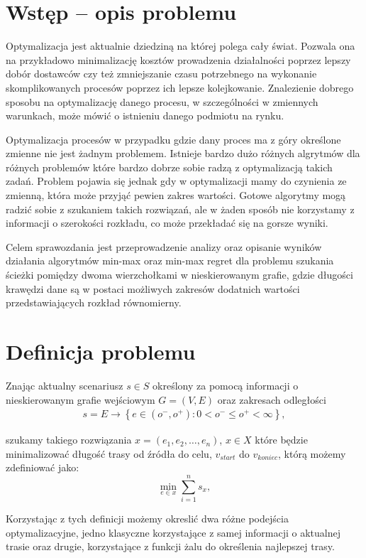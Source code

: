 \documentclass[10pt]{article}
\begin{document}
\section{Wstęp -- opis problemu}
\label{sec:wstep}
Optymalizacja jest aktualnie dziedziną na której polega cały świat. Pozwala ona na przykładowo minimalizację kosztów prowadzenia działalności poprzez lepszy dobór dostawców czy też zmniejszanie czasu potrzebnego na wykonanie skomplikowanych procesów poprzez ich lepsze kolejkowanie. Znalezienie dobrego sposobu na optymalizację danego procesu, w szczególności w zmiennych warunkach, może mówić o istnieniu danego podmiotu na rynku.

Optymalizacja procesów w przypadku gdzie dany proces ma z góry określone zmienne nie jest żadnym problemem. Istnieje bardzo dużo różnych algrytmów dla różnych problemów które bardzo dobrze sobie radzą z optymalizacją takich zadań. Problem pojawia się jednak gdy w optymalizacji mamy do czynienia ze zmienną, która może przyjąć pewien zakres wartości. Gotowe algorytmy mogą radzić sobie z szukaniem takich rozwiązań, ale w żaden sposób nie korzystamy z informacji o szerokości rozkładu, co może przekładać się na gorsze wyniki.

Celem sprawozdania jest przeprowadzenie analizy oraz opisanie wyników działania algorytmów min-max oraz min-max regret dla problemu szukania ścieżki pomiędzy dwoma wierzchołkami w nieskierowanym grafie, gdzie długości krawędzi dane są w postaci możliwych zakresów dodatnich wartości przedstawiających rozkład równomierny.

\section{Definicja problemu}
Znając aktualny scenariusz $s \in S$ określony za pomocą informacji o nieskierowanym grafie wejściowym $G = (V, E)$ oraz zakresach odległości
\begin{eqnarray*}
  s = E \rightarrow \left\{e \in (o^-,  o^+): 0 < o^- \leq o^+ < \infty\right\},
\end{eqnarray*}

szukamy takiego rozwiązania $x = \left(e_1, e_2, \dots, e_n\right)$, $x \in X$ które będzie minimalizować długość trasy od źródła do celu, $v_{start}$ do $v_{koniec}$, którą możemy zdefiniować jako:
\begin{equation}
  \min_{e \in x} \sum_{i=1}^{n} s_x,
\end{equation}

Korzystając z tych definicji możemy okreslić dwa różne podejścia optymalizacyjne, jedno klasyczne korzystające z samej informacji o aktualnej trasie oraz drugie, korzystające z funkcji żalu do określenia najlepszej trasy.
\end{document}
